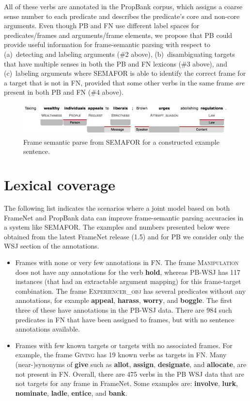 \documentclass[11pt]{article}
\newcommand{\vpred}[1]{\textbf{#1}} %
\newcommand{\fname}[1]{\textsc{#1}} %
\begin{document}
All of these verbs are annotated in the PropBank corpus, which assigns a coarse sense number 
to each predicate and describes the predicate's core and non-core arguments. 
Even though PB and FN use different label spaces for predicates/frames and 
arguments/frame elements, we propose that PB could provide useful information for frame-semantic parsing 
with respect to (a)~detecting and labeling arguments (\#2 above),  
(b)~disambiguating targets that have multiple senses in both the PB and FN lexicons (\#3 above), and
(c)~labeling arguments where SEMAFOR is able to identify the correct frame for a target that is not in FN, 
provided that some other verbs in the same frame \emph{are} present in both PB and FN (\#4 above).

\begin{figure}\centering
\includegraphics[width=.8\textwidth]{tax_example_short.jpg}
\caption{Frame semantic parse from SEMAFOR for a constructed example sentence.}
\label{fig:semaforOutput}
\end{figure}

\section{Lexical coverage}\label{sec:coverage}

The following list indicates the scenarios where a joint model based on both FrameNet and PropBank data can improve frame-semantic parsing accuracies in a system like SEMAFOR. The examples and numbers presented below were obtained from the latest FrameNet release (1.5) and for PB we consider only the WSJ section of the annotations.
\begin{itemize}
\item Frames with none or very few annotations in FN. The frame \fname{Manipulation} does not have any annotations for the verb \vpred{hold}, whereas PB-WSJ has 117 instances (that had an extractable argument mapping) for this frame-target combination. The frame \fname{Experiencer\_obj} has several predicates without any annotations, for example \vpred{appeal}, \vpred{harass}, \vpred{worry}, and \vpred{boggle}. The first three of these have annotations in the PB-WSJ data. There are 984 such predicates in FN that have been assigned to frames, but with no sentence annotations available.
\item Frames with few known targets or targets with no associated frames. 
For example, the frame \fname{Giving} has 19 known verbs as targets in FN. 
Many (near-)synonyms of \vpred{give} such as \vpred{allot}, \vpred{assign}, \vpred{designate}, and \vpred{allocate}, are not present in FN. 
Overall, there are 475 verbs in the PB WSJ data that are not targets for any frame in FrameNet. Some examples are: \vpred{involve}, \vpred{lurk}, \vpred{nominate}, \vpred{ladle}, \vpred{entice}, and \vpred{bank}.
\end{itemize}
\end{document}
